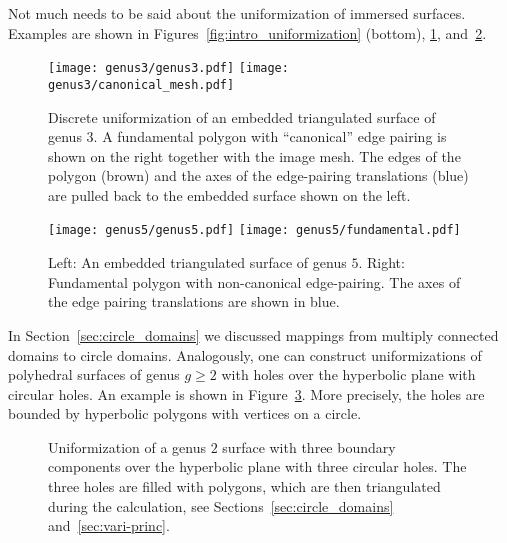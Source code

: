 \documentclass[Thesis]{subfiles}
\begin{document}
Not much needs to be said about the uniformization of immersed
surfaces. Examples are shown in Figures~\ref{fig:intro_uniformization}
(bottom), \ref{fig:embedded_genus_3}, and~\ref{fig:embedded_genus_5}.
\begin{figure}
\centering
\texttt{[image: genus3/genus3.pdf]}%
\texttt{[image: genus3/canonical\_mesh.pdf]}
\caption{Discrete uniformization of an embedded triangulated surface
  of genus $3$. A fundamental polygon with ``canonical'' edge pairing
  is shown on the right together with the image mesh. The edges of the
  polygon (brown) and the axes of the edge-pairing translations (blue)
  are pulled back to the embedded surface shown on the left.}
\label{fig:embedded_genus_3}
\end{figure}
\begin{figure}
\centering
\texttt{[image: genus5/genus5.pdf]}
\texttt{[image: genus5/fundamental.pdf]}\\
\caption{Left: An embedded triangulated surface of genus $5$. Right:
  Fundamental polygon with non-canonical edge-pairing. The axes of the
  edge pairing translations are shown in blue.}
\label{fig:embedded_genus_5}
\end{figure}
In Section~\ref{sec:circle_domains} we discussed mappings from
multiply connected domains to circle domains. Analogously, one can
construct uniformizations of polyhedral surfaces of genus $g\geq 2$
with holes over the hyperbolic plane with circular holes. An example
is shown in Figure~\ref{fig:hyperbolic_circle_domain}. More precisely,
the holes are bounded by hyperbolic polygons with vertices on a
circle. 
\begin{figure}
\centering
{}
\caption{ Uniformization of a genus $2$ surface with three boundary
  components over the hyperbolic plane with three circular holes. The
  three holes are filled with polygons, which are then triangulated
  during the calculation, see Sections~\ref{sec:circle_domains}
  and~\ref{sec:vari-princ}.  }
\label{fig:hyperbolic_circle_domain}
\end{figure}
\end{document}
